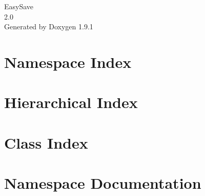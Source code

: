 \let\mypdfximage\pdfximage\def\pdfximage{\immediate\mypdfximage}\documentclass[twoside]{book}
\newcommand{\+}{\discretionary{\mbox{\scriptsize$\hookleftarrow$}}{}{}}
\newcommand{\clearemptydoublepage}{%
  \newpage{\pagestyle{empty}\cleardoublepage}%
}
\begin{document}
\raggedbottom

\hypersetup{pageanchor=false,
             bookmarksnumbered=true,
             pdfencoding=unicode
            }
\begin{titlepage}
\vspace*{7cm}
\begin{center}%
{\Large Easy\+Save \\[1ex]\large 2.\+0 }\\
\vspace*{1cm}
{\large Generated by Doxygen 1.9.1}\\
\end{center}
\end{titlepage}
\clearemptydoublepage
{}
\tableofcontents
\clearemptydoublepage
{}
\hypersetup{pageanchor=true}

\chapter{Namespace Index}

\chapter{Hierarchical Index}

\chapter{Class Index}

\chapter{Namespace Documentation}














\end{document}

